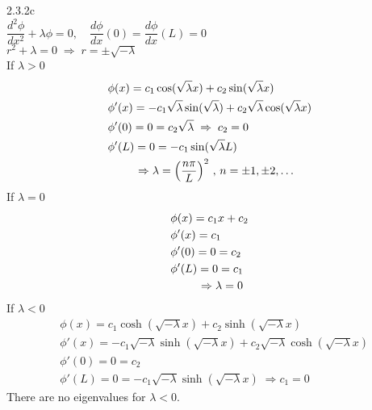 \documentclass{article}
\theoremstyle{definition}
\begin{document}
	\begin{prob}{2.3.2c} $  $ \vspace{2mm} \\
		$ \dfrac{d^2 \phi}{dx^2} + \lambda \phi = 0, \quad \dfrac{d\phi}{dx}(0) = \dfrac{d\phi}{dx}(L) = 0 $ \\
		
		$ r^2 + \lambda = 0 \; \Rightarrow \; r = \pm \sqrt{-\lambda} $ \\
		
		If $ \lambda > 0 $
		\begin{align*}
			& \phi(x) = c_1\cos(\sqrt{\lambda} x) + c_2\sin(\sqrt{\lambda} x) \\
			& \phi'(x) = -c_1\sqrt{\lambda} \sin(\sqrt{\lambda}) + c_2\sqrt{\lambda} \cos(\sqrt{\lambda} x) \\
			& \phi'(0) = 0 = c_2\sqrt{\lambda} \; \Rightarrow \; c_2 = 0 \\
			& \phi'(L) = 0 = -c_1\sin(\sqrt{\lambda} L) \\
			& \hspace{0.84cm}  \Rightarrow \lambda = \left( \frac{n\pi}{L} \right)^2 \, , \, n = \pm 1, \pm 2, \dots
		\end{align*}
		If $ \lambda = 0 $
		\begin{align*}
			& \phi(x) = c_1x + c_2 \\
			& \phi'(x) = c_1 \\
			& \phi'(0) = 0 = c_2 \\
			& \phi'(L) = 0 = c_1 \\
			& \hspace{0.84cm} \Rightarrow \lambda = 0
		\end{align*}
		If $ \lambda < 0 $
		\begin{align*}
			& \phi(x) = c_1\cosh(\sqrt{-\lambda} x) + c_2\sinh(\sqrt{-\lambda} x) \\
			& \phi'(x) = -c_1\sqrt{-\lambda} \sinh(\sqrt{-\lambda} x) + c_2 \sqrt{-\lambda} \cosh(\sqrt{-\lambda} x) \\
			& \phi'(0) = 0 = c_2 \\
			& \phi'(L) = 0 = -c_1\sqrt{-\lambda}\sinh(\sqrt{-\lambda} x) \; \Rightarrow c_1 = 0
		\end{align*}
		There are no eigenvalues for $ \lambda < 0 $.
	\end{prob}
    	
\end{document}

